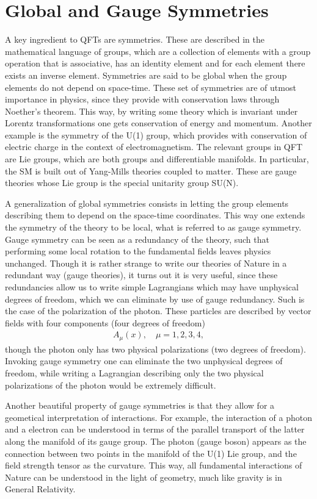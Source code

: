 \section{Global and Gauge Symmetries}

A key ingredient to QFTs are symmetries. These are described in the mathematical language of groups, which are a collection of elements with a group operation that is associative, has an identity element and for each element there exists an inverse element. Symmetries are said to be global when the group elements do not depend on space-time. These set of symmetries are of utmost importance in physics, since they provide with conservation laws through Noether's theorem. This way, by writing some theory which is invariant under Lorentz transformations one gets conservation of energy and momentum. Another example is the symmetry of the U(1) group, which provides with conservation of electric charge in the context of electromagnetism. The relevant groups in QFT are Lie groups, which are both groups and differentiable manifolds. In particular, the SM is built out of Yang-Mills theories coupled to matter. These are gauge theories whose Lie group is the special unitarity group SU(N).

A generalization of global symmetries consists in letting the group elements describing them to depend on the space-time coordinates. This way one extends the symmetry of the theory to be local, what is referred to as gauge symmetry. Gauge symmetry can be seen as a redundancy of the theory, such that performing some local rotation to the fundamental fields leaves physics unchanged. Though it is rather strange to write our theories of Nature in a redundant way (gauge theories), it turns out it is very useful, since these redundancies allow us to write simple Lagrangians which may have unphysical degrees of freedom, which we can eliminate by use of gauge redundancy. Such is the case of the polarization of the photon. These particles are described by vector fields with four components (four degrees of freedom)
\begin{gather}
A_{\mu}(x), \quad \mu=1,2,3,4,
\end{gather}
though the photon only has two physical polarizations (two degrees of freedom). Invoking gauge symmetry one can eliminate the two unphysical degrees of freedom, while writing a Lagrangian describing only the two physical polarizations of the photon would be extremely difficult. 

Another beautiful property of gauge symmetries is that they allow for a geometical interpretation of interactions. For example, the interaction of a photon and a electron can be understood in terms of the parallel transport of the latter along the manifold of its gauge group. The photon (gauge boson) appears as the connection between two points in the manifold of the U(1) Lie group, and the field strength tensor as the curvature. This way, all fundamental interactions of Nature can be understood in the light of geometry, much like gravity is in General Relativity.

